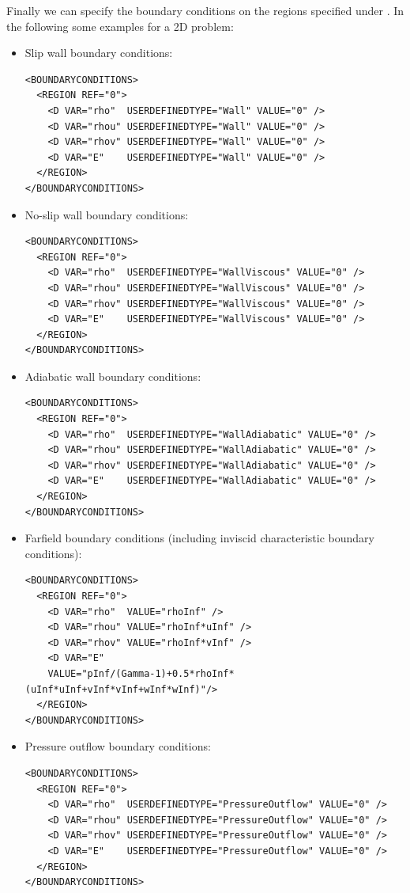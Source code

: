 Finally we can specify the boundary conditions on the regions specified under .
In the following some examples for a 2D problem:
\begin{itemize}
\item Slip wall boundary conditions:
\begin{lstlisting}[style=XmlStyle]
<BOUNDARYCONDITIONS>
  <REGION REF="0">
    <D VAR="rho"  USERDEFINEDTYPE="Wall" VALUE="0" />
    <D VAR="rhou" USERDEFINEDTYPE="Wall" VALUE="0" />
    <D VAR="rhov" USERDEFINEDTYPE="Wall" VALUE="0" />
    <D VAR="E"    USERDEFINEDTYPE="Wall" VALUE="0" />
  </REGION>
</BOUNDARYCONDITIONS>
\end{lstlisting}

\item No-slip wall boundary conditions:
\begin{lstlisting}[style=XmlStyle]
<BOUNDARYCONDITIONS>
  <REGION REF="0">
    <D VAR="rho"  USERDEFINEDTYPE="WallViscous" VALUE="0" />
    <D VAR="rhou" USERDEFINEDTYPE="WallViscous" VALUE="0" />
    <D VAR="rhov" USERDEFINEDTYPE="WallViscous" VALUE="0" />
    <D VAR="E"    USERDEFINEDTYPE="WallViscous" VALUE="0" />
  </REGION>
</BOUNDARYCONDITIONS>
\end{lstlisting}

\item Adiabatic wall boundary conditions:
\begin{lstlisting}[style=XmlStyle]
<BOUNDARYCONDITIONS>
  <REGION REF="0">
    <D VAR="rho"  USERDEFINEDTYPE="WallAdiabatic" VALUE="0" />
    <D VAR="rhou" USERDEFINEDTYPE="WallAdiabatic" VALUE="0" />
    <D VAR="rhov" USERDEFINEDTYPE="WallAdiabatic" VALUE="0" />
    <D VAR="E"    USERDEFINEDTYPE="WallAdiabatic" VALUE="0" />
  </REGION>
</BOUNDARYCONDITIONS>
\end{lstlisting}

\item Farfield boundary conditions (including inviscid characteristic boundary conditions):
\begin{lstlisting}[style=XmlStyle] 
<BOUNDARYCONDITIONS>  
  <REGION REF="0">
    <D VAR="rho"  VALUE="rhoInf" />
    <D VAR="rhou" VALUE="rhoInf*uInf" />
    <D VAR="rhov" VALUE="rhoInf*vInf" />
    <D VAR="E"    
    VALUE="pInf/(Gamma-1)+0.5*rhoInf*(uInf*uInf+vInf*vInf+wInf*wInf)"/>
  </REGION>
</BOUNDARYCONDITIONS>
\end{lstlisting}

\item Pressure outflow boundary conditions:
\begin{lstlisting}[style=XmlStyle]                
<BOUNDARYCONDITIONS>
  <REGION REF="0">
    <D VAR="rho"  USERDEFINEDTYPE="PressureOutflow" VALUE="0" />
    <D VAR="rhou" USERDEFINEDTYPE="PressureOutflow" VALUE="0" />
    <D VAR="rhov" USERDEFINEDTYPE="PressureOutflow" VALUE="0" />
    <D VAR="E"    USERDEFINEDTYPE="PressureOutflow" VALUE="0" />
  </REGION>
</BOUNDARYCONDITIONS>
\end{lstlisting}
\end{itemize}

